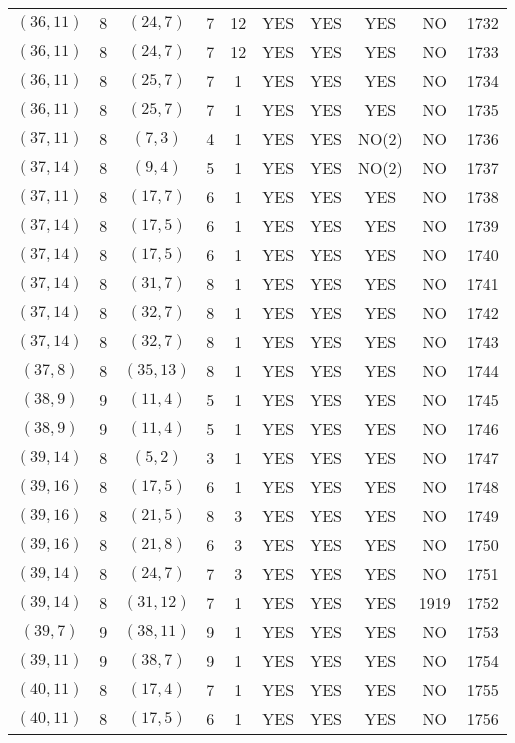 \begin{longtable}{|c|c|c|c|c|c|c|c|c|c|}
$(36, 11)$ & 8 & $(24, 7)$ & 7 & 12 & YES & YES & YES & NO & 1732\\
$(36, 11)$ & 8 & $(24, 7)$ & 7 & 12 & YES & YES & YES & NO & 1733\\
$(36, 11)$ & 8 & $(25, 7)$ & 7 & 1 & YES & YES & YES & NO & 1734\\
$(36, 11)$ & 8 & $(25, 7)$ & 7 & 1 & YES & YES & YES & NO & 1735\\
$(37, 11)$ & 8 & $(7, 3)$ & 4 & 1 & YES & YES & NO(2) & NO & 1736\\
$(37, 14)$ & 8 & $(9, 4)$ & 5 & 1 & YES & YES & NO(2) & NO & 1737\\
$(37, 11)$ & 8 & $(17, 7)$ & 6 & 1 & YES & YES & YES & NO & 1738\\
$(37, 14)$ & 8 & $(17, 5)$ & 6 & 1 & YES & YES & YES & NO & 1739\\
$(37, 14)$ & 8 & $(17, 5)$ & 6 & 1 & YES & YES & YES & NO & 1740\\
$(37, 14)$ & 8 & $(31, 7)$ & 8 & 1 & YES & YES & YES & NO & 1741\\
$(37, 14)$ & 8 & $(32, 7)$ & 8 & 1 & YES & YES & YES & NO & 1742\\
$(37, 14)$ & 8 & $(32, 7)$ & 8 & 1 & YES & YES & YES & NO & 1743\\
$(37, 8)$ & 8 & $(35, 13)$ & 8 & 1 & YES & YES & YES & NO & 1744\\
$(38, 9)$ & 9 & $(11, 4)$ & 5 & 1 & YES & YES & YES & NO & 1745\\
$(38, 9)$ & 9 & $(11, 4)$ & 5 & 1 & YES & YES & YES & NO & 1746\\
$(39, 14)$ & 8 & $(5, 2)$ & 3 & 1 & YES & YES & YES & NO & 1747\\
$(39, 16)$ & 8 & $(17, 5)$ & 6 & 1 & YES & YES & YES & NO & 1748\\
$(39, 16)$ & 8 & $(21, 5)$ & 8 & 3 & YES & YES & YES & NO & 1749\\
$(39, 16)$ & 8 & $(21, 8)$ & 6 & 3 & YES & YES & YES & NO & 1750\\
$(39, 14)$ & 8 & $(24, 7)$ & 7 & 3 & YES & YES & YES & NO & 1751\\
$(39, 14)$ & 8 & $(31, 12)$ & 7 & 1 & YES & YES & YES & 1919 & 1752\\
$(39, 7)$ & 9 & $(38, 11)$ & 9 & 1 & YES & YES & YES & NO & 1753\\
$(39, 11)$ & 9 & $(38, 7)$ & 9 & 1 & YES & YES & YES & NO & 1754\\
$(40, 11)$ & 8 & $(17, 4)$ & 7 & 1 & YES & YES & YES & NO & 1755\\
$(40, 11)$ & 8 & $(17, 5)$ & 6 & 1 & YES & YES & YES & NO & 1756\\

\end{longtable}
